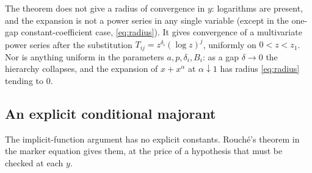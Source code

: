 \begin{remark}
The theorem does not give a radius of convergence in $y$: logarithms are present, and the expansion is not a power series in any single variable (except in the one-gap constant-coefficient case, \eqref{eq:radius}). It gives convergence of a multivariate power series after the substitution $T_{ij}=z^{\delta_i}(\log z)^j$, uniformly on $0<z<z_1$. Nor is anything uniform in the parameters $a,p,\delta_i,B_i$: as a gap $\delta\to0$ the hierarchy collapses, and the expansion of $x+x^\alpha$ at $\alpha\downarrow1$ has radius \eqref{eq:radius} tending to $0$.
\end{remark}

\subsection{An explicit conditional majorant}

The implicit-function argument has no explicit constants. Rouch\'e's theorem in the marker equation gives them, at the price of a hypothesis that must be checked at each $y$.

